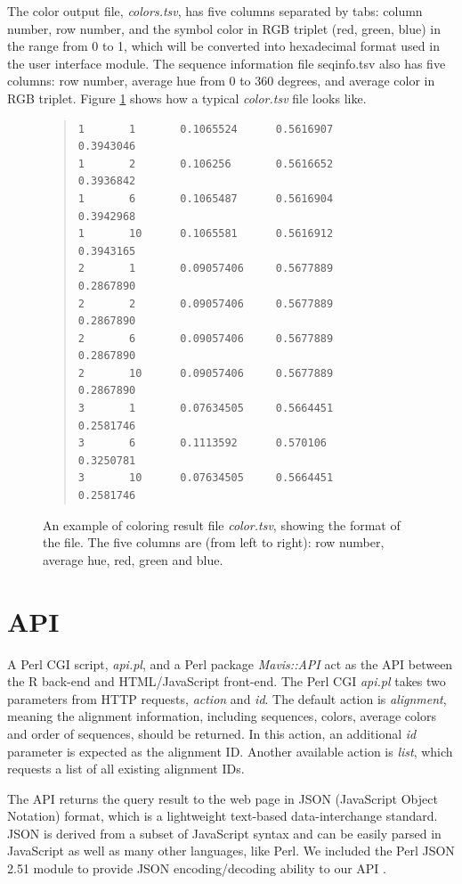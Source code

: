 The color output file, \emph{colors.tsv}, has five columns separated by tabs: column number, row number, and the symbol color in RGB triplet (red, green, blue) in the range from 0 to 1, which will be converted into hexadecimal format used in the user interface module. The sequence information file seqinfo.tsv also has five columns: row number, average hue from 0 to 360 degrees, and average color in RGB triplet. Figure \ref{fig:color.tsv} shows how a typical \emph{color.tsv} file looks like.
\begin{figure}[hbt]
\begin{quote}
\begin{verbatim}
1       1       0.1065524      0.5616907       0.3943046
1       2       0.106256       0.5616652       0.3936842
1       6       0.1065487      0.5616904       0.3942968
1       10      0.1065581      0.5616912       0.3943165
2       1       0.09057406     0.5677889       0.2867890
2       2       0.09057406     0.5677889       0.2867890
2       6       0.09057406     0.5677889       0.2867890
2       10      0.09057406     0.5677889       0.2867890
3       1       0.07634505     0.5664451       0.2581746
3       6       0.1113592      0.570106        0.3250781
3       10      0.07634505     0.5664451       0.2581746
\end{verbatim}
\end{quote}
\caption[Example of Coloring Result File]{An example of coloring result file \emph{color.tsv}, showing the format of the file. The five columns are (from left to right): row number, average hue, red, green and blue.}\label{fig:color.tsv}
\end{figure}

\section{API}

A Perl CGI script, \emph{api.pl}, and a Perl package \emph{Mavis::API} act as the API between the R back-end and HTML/JavaScript front-end. The Perl CGI \emph{api.pl} takes two parameters from HTTP requests, \emph{action} and \emph{id}. The default action is \emph{alignment}, meaning the alignment information, including sequences, colors, average colors and order of sequences, should be returned. In this action, an additional \emph{id} parameter is expected as the alignment ID. Another available action is \emph{list}, which requests a list of all existing alignment IDs.

The API returns the query result to the web page in JSON (JavaScript Object Notation) format, which is a lightweight text-based data-interchange standard. JSON is derived from a subset of JavaScript syntax and can be easily parsed in JavaScript as well as many other languages, like Perl. We included the Perl JSON 2.51 module to provide JSON encoding/decoding ability to our API \cite{crockford2006application}.

